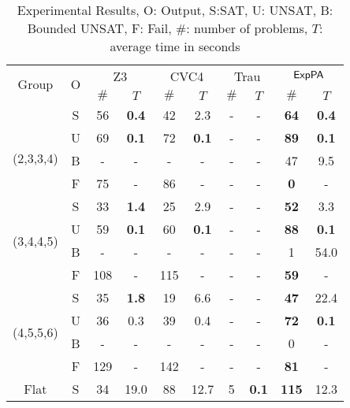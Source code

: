 \begin{table}[ht]
        \caption{Experimental Results, O: Output, S:SAT, U: UNSAT, B: Bounded UNSAT, F: Fail, 
    $\#$: number of problems, $T$: average time in seconds}
    \centering
    \renewcommand{\arraystretch}{1.1}
    \begin{tabular}{|c|c|c|c|c|c|c|c|c|c|}
    \hline
        \multirow{2}{*}{Group }  & \multirow{2}{*}{O} & \multicolumn{2}{c|}{Z3} & \multicolumn{2}{c|}{CVC4} &  \multicolumn{2}{c|}{Trau} & \multicolumn{2}{c|}{${\sf ExpPA}$} \\
        \cline{3-10}
        &  & \scriptsize{$\#$} & \scriptsize{$T$}  & \scriptsize{$\#$} & \scriptsize{$T$}  & \scriptsize{$\#$} & \scriptsize{$T$} & \scriptsize{$\#$} & \scriptsize{$T$}  \\ \hline
        \multirow{4}{*}{
        \newline \scriptsize{(2,3,3,4)}} & S & 56 & {\bf 0.4} & 42 & 2.3 & - & - &  {\bf 64} & {\bf 0.4} \\
        \cline{2-10}
         & U & 69 & {\bf 0.1} & 72 &  {\bf 0.1} & - & - &  {\bf 89} & {\bf 0.1} \\
         \cline{2-10}
         & B & - & - & - & - & - & - &  47 & 9.5 \\
         \cline{2-10}
         & F & 75 & - & 86 & - & - & - &  {\bf 0} & - \\ \hline
         \cline{1-10}
        \multirow{4}{*}{\scriptsize{(3,4,4,5)}} & S & 33 & {\bf 1.4} & 25 & 2.9 & - & - &  {\bf 52} & 3.3 \\
        \cline{2-10}
         & U & 59 & {\bf 0.1} & 60 & {\bf 0.1} & - & - &  {\bf 88} & {\bf 0.1} \\
         \cline{2-10}
         & B & -  & - &  - & -  & - & - &  1 & 54.0 \\
         \cline{2-10}
         & F & 108 & - & 115 & - & - & - &  {\bf 59} & - \\ \hline
         \cline{1-10}
        \multirow{4}{*}{\scriptsize{(4,5,5,6)}} & S & 35 & {\bf 1.8} & 19 & 6.6 & - & - &  {\bf 47} & 22.4 \\
        \cline{2-10}
         & U & 36 & 0.3 & 39 & 0.4 & - & - &  {\bf 72} & {\bf 0.1} \\
         \cline{2-10}
         & B & -  & -  & - & - & - & - &  0 & - \\
         \cline{2-10}
         & F & 129 & - & 142 & - & - & - &  {\bf 81} & -\\
         \hline
         \cline{1-10}
        \multirow{3}{*}{\scriptsize{Flat}} 
         & S & 34 & 19.0 & 88 & 12.7 & 5 & {\bf 0.1}& {\bf 115}  & 12.3\\

\end{tabular}
\end{table}
